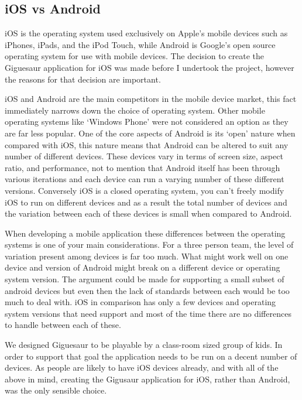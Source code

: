 \documentclass{article}
\begin{document}
\subsection{iOS vs Android}


iOS is the operating system used exclusively on Apple's mobile devices such as iPhones, iPads, and the iPod Touch, while Android is Google's open source operating system for use with mobile devices. The decision to create the Giguesaur application for iOS was made before I undertook the project, however the reasons for that decision are important. 

iOS and Android are the main competitors in the mobile device market, this fact immediately narrows down the choice of operating system. Other mobile operating systems like `Windows Phone' were not considered an option as they are far less popular. One of the core aspects of Android is its `open' nature when compared with iOS, this nature means that Android can be altered to suit any number of different devices. These devices vary in terms of screen size, aspect ratio, and performance, not to mention that Android itself has been through various iterations and each device can run a varying number of these different versions. Conversely iOS is a closed operating system, you can't freely modify iOS to run on different devices and as a result the total number of devices and the variation between each of these devices is small when compared to Android. 

When developing a mobile application these differences between the operating systems is one of your main considerations. For a three person team, the level of variation present among devices is far too much. What might work well on one device and version of Android might break on a different device or operating system version. The argument could be made for supporting a small subset of android devices but even then the lack of standards between each would be too much to deal with. iOS in comparison has only a few devices and operating system versions that need support and most of the time there are no differences to handle between each of these. 

We designed Giguesaur to be playable by a class-room sized group of kids. In order to support that goal the application needs to be run on a decent number of devices. As people are likely to have iOS devices already, and with all of the above in mind, creating the Gigusaur application for iOS, rather than Android, was the only sensible choice. 
\end{document}
